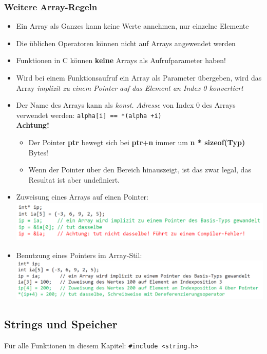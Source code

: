 		\subsubsection{Weitere Array-Regeln}
			\begin{itemize}
				\item Ein Array als Ganzes kann keine Werte annehmen, nur einzelne Elemente
				\item Die üblichen Operatoren können nicht auf Arrays angewendet werden
				\item Funktionen in C können \textbf{keine} Arrays als Aufrufparameter haben!
				\item Wird bei einem Funktionsaufruf ein Array als Parameter übergeben, wird das Array \textit{implizit zu einem Pointer auf das Element an Index 0 konvertiert}
				\item Der Name des Arrays kann als \textit{konst. Adresse} von Index 0 des Arrays verwendet werden: \verb|alpha[i] == *(alpha +i)| \\
				\textbf{Achtung!}
				\begin{itemize}
					\item Der Pointer \textbf{ptr} bewegt sich bei \textbf{ptr$+$n} immer um \textbf{n * sizeof(Typ)} Bytes!
					\item Wenn der Pointer über den Bereich hinauszeigt, ist das zwar legal, das Resultat ist aber undefiniert.
				\end{itemize}
				\item Zuweisung eines Arrays auf einen Pointer:\\
				\includegraphics[height=2cm]{Bilder/arr-ptr-zuweisung.png}
				\item Benutzung eines Pointers im Array-Stil:\\
				\includegraphics[height=2cm]{Bilder/ptr-im-arr-stil.png}	
			\end{itemize}

	\subsection{Strings und Speicher}
		Für alle Funktionen in diesem Kapitel: \verb|#include <string.h>|
